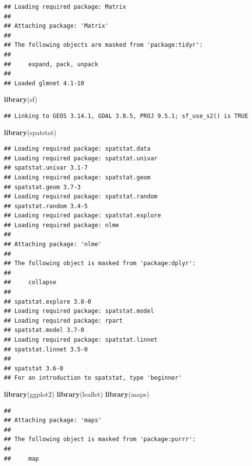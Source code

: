 \documentclass[
]{article}
\newenvironment{Shaded}{\begin{snugshade}}{\end{snugshade}}
\newcommand{\FunctionTok}[1]{\textcolor[rgb]{0.13,0.29,0.53}{\textbf{#1}}}
\newcommand{\NormalTok}[1]{#1}
\begin{document}
\begin{verbatim}
## Loading required package: Matrix
## 
## Attaching package: 'Matrix'
## 
## The following objects are masked from 'package:tidyr':
## 
##     expand, pack, unpack
## 
## Loaded glmnet 4.1-10
\end{verbatim}

\begin{Shaded}
\begin{Highlighting}[]
\FunctionTok{library}\NormalTok{(sf)  }
\end{Highlighting}
\end{Shaded}

\begin{verbatim}
## Linking to GEOS 3.14.1, GDAL 3.8.5, PROJ 9.5.1; sf_use_s2() is TRUE
\end{verbatim}

\begin{Shaded}
\begin{Highlighting}[]
\FunctionTok{library}\NormalTok{(spatstat) }
\end{Highlighting}
\end{Shaded}

\begin{verbatim}
## Loading required package: spatstat.data
## Loading required package: spatstat.univar
## spatstat.univar 3.1-7
## Loading required package: spatstat.geom
## spatstat.geom 3.7-3
## Loading required package: spatstat.random
## spatstat.random 3.4-5
## Loading required package: spatstat.explore
## Loading required package: nlme
## 
## Attaching package: 'nlme'
## 
## The following object is masked from 'package:dplyr':
## 
##     collapse
## 
## spatstat.explore 3.8-0
## Loading required package: spatstat.model
## Loading required package: rpart
## spatstat.model 3.7-0
## Loading required package: spatstat.linnet
## spatstat.linnet 3.5-0
## 
## spatstat 3.6-0 
## For an introduction to spatstat, type 'beginner'
\end{verbatim}

\begin{Shaded}
\begin{Highlighting}[]
\FunctionTok{library}\NormalTok{(ggplot2)  }
\FunctionTok{library}\NormalTok{(leaflet)}
\FunctionTok{library}\NormalTok{(maps)}
\end{Highlighting}
\end{Shaded}

\begin{verbatim}
## 
## Attaching package: 'maps'
## 
## The following object is masked from 'package:purrr':
## 
##     map
\end{verbatim}
\end{document}
